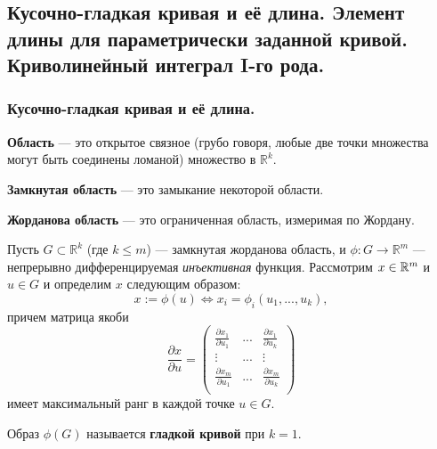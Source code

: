 \subsection{Кусочно-гладкая кривая и её длина. Элемент длины для параметрически заданной кривой. Криволинейный интеграл I-го рода.}

\subsubsection{Кусочно-гладкая кривая и её длина.}

\begin{definition*}
    \textbf{Область} --- это открытое связное (грубо говоря, любые две точки множества могут быть соединены ломаной) множество в $\mathbb{R}^k$.
\end{definition*}

\begin{definition*}
    \textbf{Замкнутая область} --- это замыкание некоторой области.
\end{definition*}

\begin{definition*}
    \textbf{Жорданова область} --- это ограниченная область, измеримая по Жордану.
\end{definition*}

Пусть $G \subset \mathbb{R}^k$ (где $k \leq m$) --- замкнутая жорданова область, и $\phi: G \rightarrow \mathbb{R}^m$ --- непрерывно дифференцируемая \textit{инъективная} функция. Рассмотрим $x \in \mathbb{R}^m$ и  $u \in G$ и определим $x$ следующим образом:
\begin{equation*}
    x := \phi(u) \iff x_i = \phi_i(u_1, ..., u_k),
\end{equation*}
причем матрица якоби
\begin{equation*}
    \dfrac{\partial x}{\partial u} 
    = 
    \begin{pmatrix}
        \frac{\partial x_1}{\partial u_1} & ... & \frac{\partial x_1}{\partial u_k} \\
        \vdots & ... & \vdots \\
        \frac{\partial x_m}{\partial u_1} & ... & \frac{\partial x_m}{\partial u_k} \\
    \end{pmatrix}
\end{equation*}
имеет максимальный ранг в каждой точке $u \in G$.

\begin{definition*}
    Образ $\phi(G)$ называется \textbf{гладкой кривой} при $k = 1$.
\end{definition*}

